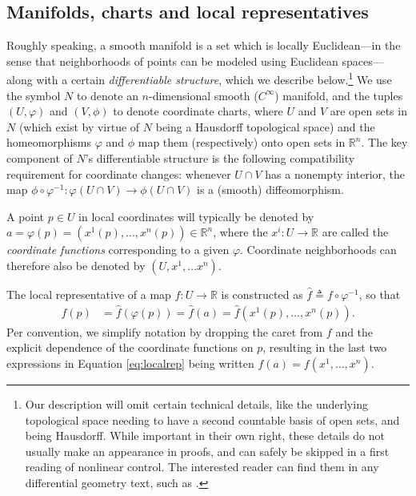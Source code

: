 \documentclass[psamsfonts]{amsart}
\theoremstyle{definition}
\theoremstyle{remark}
\newcommand*\R{\mathds{R}}
\numberwithin{equation}{section}
\begin{document}
\subsection{Manifolds, charts and local representatives}

Roughly speaking, a smooth manifold is a set which is locally Euclidean---in the sense that neighborhoods of points can be modeled using Euclidean spaces---along with a certain \textit{differentiable structure}, which we describe below.\footnote{Our description will omit certain technical details, like the underlying topological space needing to have a second countable basis of open sets, and being Hausdorff. While important in their own right, these details do not usually make an appearance in proofs, and can safely be skipped in a first reading of nonlinear control. The interested reader can find them in any differential geometry text, such as \cite{abraham_manifolds_1988}.} We use the symbol $N$ to denote an $n$-dimensional smooth ($C^{\infty}$) manifold, and the tuples $(U, \varphi)$ and $(V, \phi)$ to denote coordinate charts, where $U$ and $V$ are open sets in $N$ (which exist by virtue of $N$ being a Hausdorff topological space) and the homeomorphisms $\varphi$ and $\phi$ map them (respectively) onto open sets in $\R^n$. The key component of $N$'s differentiable structure is the following compatibility requirement for coordinate changes: whenever $U \cap V$ has a nonempty interior, the map $\phi\circ\varphi^{-1}: \varphi(U\cap V) \rightarrow \phi(U\cap V)$ is a (smooth) diffeomorphism. %

A point $p\in U$ in local coordinates will typically be denoted by $a = \varphi (p) = (x^1(p), \dots, x^n(p)) \in \R^n$, where the $x^i: U \rightarrow \R$ are called the \textit{coordinate functions} corresponding to a given $\varphi$. Coordinate neighborhoods can therefore also be denoted by $(U, x^1, \dots x^n)$. 

The local representative of a map $f:U\rightarrow \R$ is constructed as $\hat f \triangleq f\circ \varphi^{-1}$, so that 
\begin{align}\label{eq:localrep}
f(p) & = \hat f(\varphi(p)) =\hat f(a) = \hat f(x^1(p), \dots, x^n(p)).
\end{align}
Per convention, we simplify notation by dropping the caret from $f$ and the explicit dependence of the coordinate functions on $p$, resulting in the last two expressions in Equation \ref{eq:localrep} being written $f(a) = f(x^1, \dots, x^n)$. 
\end{document}
